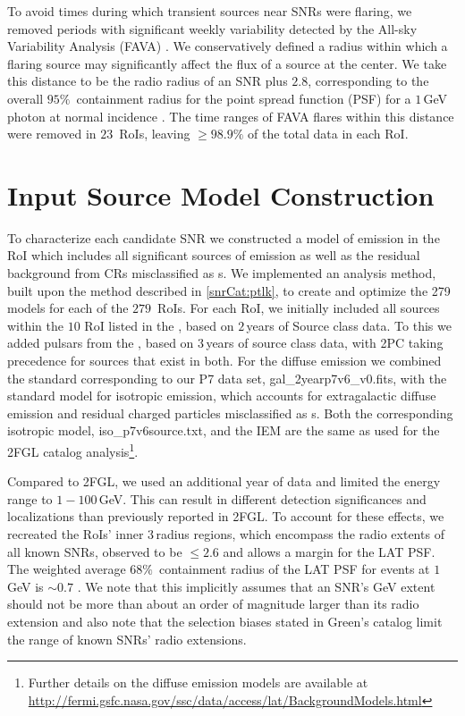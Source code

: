 {To avoid times during which transient sources near SNRs were flaring, we removed periods with significant weekly variability detected by the \Fermi{} All-sky Variability Analysis (FAVA) \citep{fava13}. We conservatively defined a radius within which a flaring source may significantly affect the flux of a source at the center. We take this distance to be the radio radius of an SNR plus $2.8$\degr, corresponding to the overall $95\%$~containment radius for the \FermiLat{} point spread function (PSF) for a $1$\,GeV photon at normal incidence \citep{lat_perf}. The time ranges of FAVA flares within this distance were removed in $23$~RoIs, leaving $\geq 98.9\%$ of the total data in each RoI.

\section{Input Source Model Construction}\label{snrcat:AddSrcs}
To characterize each candidate SNR we constructed a model of \gam{} emission in the RoI which includes all significant sources of emission as well as the residual background from CRs misclassified as \gam{}s. We implemented an analysis method, built upon the \srcs{} method described in \ref{snrCat:ptlk}, to create and optimize the 279 models for each of the $279$~RoIs. For each RoI, we initially included all sources within the $10$\degr{} RoI listed in the \twofgl{} \citep{2FGL}, based on $2$\,years of Source class data. To this we added pulsars from the \twopc{} \citep{2PC}, based on $3$\,years of source class data, with 2PC taking precedence for sources that exist in both. 
For the diffuse emission we combined the standard \iem{} corresponding to our P7 data set, gal\_2yearp7v6\_v0.fits, with the standard model for isotropic emission, which accounts for extragalactic diffuse \gam{} emission and residual charged particles misclassified as \gam{}s. Both the corresponding isotropic model, iso\_p7v6source.txt, and the IEM are the same as used for the 2FGL catalog analysis\footnote{Further details on the diffuse emission models are available at \url{http://fermi.gsfc.nasa.gov/ssc/data/access/lat/BackgroundModels.html} \jamie{and in Chapter blah]}}. 

Compared to 2FGL, we used an additional year of data and limited the energy range to $1-100$\,GeV. This can result in different detection significances and localizations than previously reported in 2FGL. To account for these effects, we recreated the RoIs' inner $3$\degr{}\,radius regions, which encompass the radio extents of all known SNRs, observed to be $\leq 2.6$\degr{} and allows a margin for the LAT PSF. The weighted average $68\%$~containment radius of the LAT PSF for events at $1$\,GeV is $\sim0.7$\degr{} \citep{lat_perfo}. We note that this implicitly assumes that an SNR's GeV extent should not be more than about an order of magnitude larger than its radio extension and also note that the selection biases stated in Green's catalog limit the range of known SNRs' radio extensions. 

}
